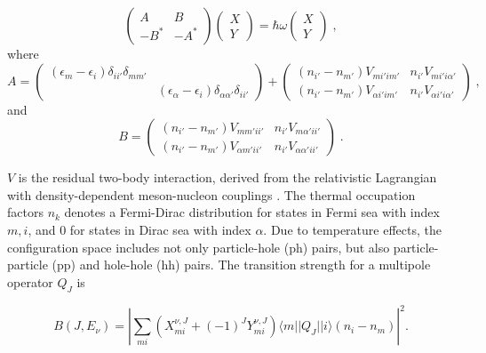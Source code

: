 \documentclass[aps,preprint,showpacs,superscriptaddress,floatfix]{revtex4-1} %
\begin{document}
\begin{equation}
   \left( \begin{array}{cc} A & B \\ -B^* & -A^* \end{array} \right)
   \left( \begin{array}{c} X \\ Y \end{array} \right)
   = \hbar\omega \left( \begin{array}{c} X \\ Y \end{array} \right) \;,
\end{equation}
where
\begin{equation}
   A = \left( \begin{array}{cc} (\epsilon_m - \epsilon_i)
   \delta_{ii'} \delta_{mm'} &  \\
   & (\epsilon_\alpha - \epsilon_i) \delta_{\alpha \alpha'}
   \delta_{ii'} \end{array} \right)
   + \left( \begin{array}{cc} (n_{i'} - n_{m'})V_{mi'im'} & n_{i'} V_{mi'i\alpha'} \\
   (n_{i'} - n_{m'})V_{\alpha i' i m'}  &n_{i'} V_{\alpha i' i \alpha'} \end{array}
   \right) \;,
  \end{equation}
  and
\begin{equation}
   B =\left( \begin{array}{cc} (n_{i'} - n_{m'})V_{mm'ii'} & n_{i'}V_{m\alpha'ii'} \\
    (n_{i'} - n_{m'})V_{\alpha m' i i'}  & n_{i'}  V_{\alpha \alpha' i i' } \end{array}
    \right)\; .
  \end{equation}

$V$ is the residual two-body interaction, derived from the relativistic Lagrangian with  density-dependent meson-nucleon couplings \cite{Niksic}. The thermal occupation factors $n_k$ denotes a Fermi-Dirac distribution for states in Fermi sea with index $m,i$, and $0$ for states in Dirac sea with index $\alpha$. Due to temperature effects, the configuration space includes not only particle-hole (ph) pairs, but also particle-particle (pp) and hole-hole (hh) pairs. The transition strength for a multipole operator $Q_J$ is

\begin{equation}
   B(J,E_\nu) = \left | \sum_{mi} (X^{\nu,J}_{mi} +
   (-1)^J Y^{\nu,J}_{mi} ) \langle m || Q_J || i\rangle (n_i
   -n_m) \right |^2.
\end{equation}
\end{document}
